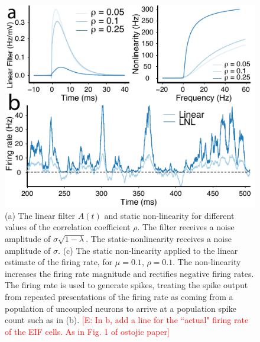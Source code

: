 \documentclass[%
 reprint,
 twocolumn,
 amsmath,amssymb,
 aps,
floatfix,
]{revtex4}
\newcommand{\Ecomment}[1]{\textcolor{red}{[E: #1]}}
\begin{document}
\begin{figure}[t!]
\includegraphics{figures/LNL_schematic}
\caption{\label{fig:schematic2}  (a) The linear filter $A(t)$ and static non-linearity for different values of the correlation coefficient $\rho$. The filter receives a noise amplitude of $\sigma\sqrt{1-\lambda}$. The static-nonlinearity receives a noise amplitude of $\sigma$. (c) The static non-linearity applied to the linear estimate of the firing rate, for $\mu = 0.1$, $\rho = 0.1$. The non-linearity increases the firing rate magnitude and rectifies negative firing rates. The firing rate is used to generate spikes, treating the spike output from repeated presentations of the firing rate as coming from a population of uncoupled neurons to arrive at a population spike count such as in (b).  \Ecomment{In b, add a line for the ``actual" firing rate of the EIF cells. As in Fig. 1 of ostojic paper}}
\end{figure}
\end{document}
